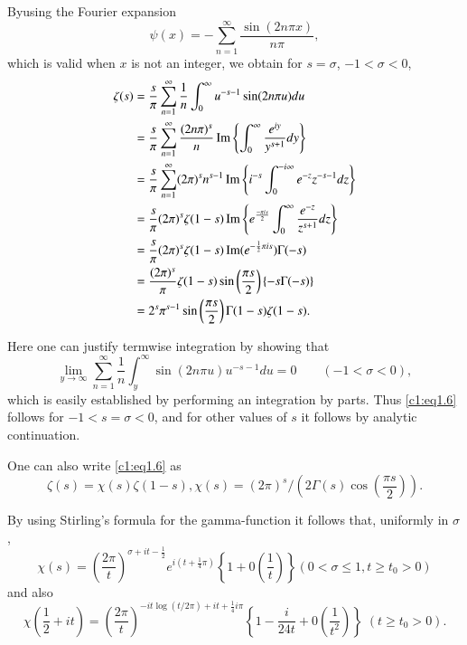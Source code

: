 By\pageoriginale using the Fourier expansion 
$$
\psi (x) =- \sum^\infty_{n=1} \frac{\sin (2 n \pi x)}{n \pi},
$$
which is valid when $x$ is not an integer, we obtain for $s = \sigma$,
$-1< \sigma < 0$,
\begin{align*}
  \zeta (s) & = \frac{s}{\pi} \sum^\infty_{n=1} \frac{1}{n}
  \int^\infty_{0} u^{-s-1} \sin (2 n \pi u) du\\
  & = \frac{s}{\pi} \sum^\infty_{n=1} \frac{(2 n \pi)^s}{n} \operatorname{Im}
  \left\{\int^\infty_0 \frac{e^{iy}}{y^{s+1}} dy \right\}\\
  & = \frac{s}{\pi} \sum^\infty_{n=1} (2 \pi)^s n^{s-1} \operatorname{Im}
  \left\{i^{-s} \int^{-i \infty}_0 e^{-z} z^{-s-1}dz \right\}\\
  & = \frac{s}{\pi} (2 \pi)^s \zeta (1-s) \operatorname{Im} \left\{
  e^{\frac{- \pi i s}{2}} \int^\infty_0 \frac{e^{-z}}{z^{s+1}}
    dz\right\}\\
    & = \frac{s}{\pi} (2 \pi)^s \zeta (1-s) \operatorname{Im} (e^{- \frac{1}{2} \pi
      i s}) \Gamma (-s)\\
    & = \frac{(2 \pi)^s}{\pi} \zeta (1 -s) \sin \left(\frac{\pi
      s}{2}\right)\{ -s \Gamma (-s)\}\\
    & = 2^s \pi^{s-1} \sin \left( \frac{\pi s}{2}\right) \Gamma (1- s)
    \zeta (1-s).
\end{align*}

Here one can justify termwise integration by showing that
$$
\lim\limits_{y \to \infty} \sum^\infty_{n=1} \frac{1}{n}
\int^\infty_{y} \sin (2 n \pi u) u^{-s -1} du =0 \qquad (-1 < \sigma <
0), 
$$
which is easily established by performing an integration by
parts. Thus \eqref{c1:eq1.6} follows for $-1 < s = \sigma < 0$, and
for other values of $s$ it follows by analytic continuation.

One can also write \eqref{c1:eq1.6} as 
\begin{equation}
  \zeta (s) = \chi (s) \zeta (1- s), \chi (s) = (2 \pi)^s /\left(2 \Gamma
  (s)\cos \left(\frac{\pi s}{2} \right)\right).\label{c1:eq1.8}
\end{equation}

By using Stirling's formula for the gamma-function it follows that,
uniformly in $\sigma$,
\begin{equation}
\chi (s) = \left(\frac{2 \pi}{t} \right)^{\sigma + it -
  \frac{1}{2}} e^{i (t+ \frac{1}{4} \pi)} \left\{1 + 0 \left(\frac{1}{t}\right)
\right\} (0 < \sigma \leq 1, t \geq t_0 > 0)
\label{c1:eq1.9}
\end{equation}
and also
\begin{equation}
\chi \left(\frac{1}{2} + it\right) = \left(\frac{2 \pi}{t} \right)^{- it 
  \log (t/2\pi) + it  + \frac{1}{4} i \pi} \left\{1- \frac{i}{24
  t} + 0 \left(\frac{1}{t^2} \right)\right\} \; (t \geq t_0 > 0).\label{c1:eq1.10}
\end{equation}
\pageoriginale

